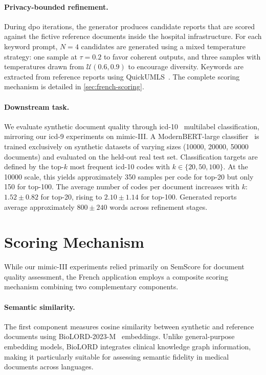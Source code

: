 \paragraph{Privacy-bounded refinement.}
During \gls{dpo} iterations, the generator produces candidate reports that are scored against the fictive reference documents inside the hospital infrastructure.
For each keyword prompt, $N=4$ candidates are generated using a mixed temperature strategy: one sample at $\tau = 0.2$ to favor coherent outputs, and three samples with temperatures drawn from $\mathcal{U}(0.6, 0.9)$ to encourage diversity.
Keywords are extracted from reference reports using QuickUMLS~\citep{soldainiQuickUMLSFastUnsupervised2016}.
The complete scoring mechanism is detailed in \autoref{sec:french-scoring}.

\paragraph{Downstream task.}
We evaluate synthetic document quality through \gls{icd}-10~\citep{who_icd10} multilabel classification, mirroring our \gls{icd}-9 experiments on \gls{mimic}-III.
A ModernBERT-large classifier~\citep{warner2025smarter} is trained exclusively on synthetic datasets of varying sizes (\num{10000}, \num{20000}, \num{50000} documents) and evaluated on the held-out real test set.
Classification targets are defined by the top-$k$ most frequent \gls{icd}-10 codes with $k \in \{20, 50, 100\}$.
At the \num{10000} scale, this yields approximately \num{350} samples per code for top-20 but only \num{150} for top-100.
The average number of codes per document increases with $k$: $1.52 \pm 0.82$ for top-20, rising to $2.10 \pm 1.14$ for top-100.
Generated reports average approximately $800 \pm 240$ words across refinement stages.

\section{Scoring Mechanism}
\label{sec:french-scoring}

While our \gls{mimic}-III experiments relied primarily on SemScore for document quality assessment, the French application employs a composite scoring mechanism combining two complementary components.

\paragraph{Semantic similarity.}
The first component measures cosine similarity between synthetic and reference documents using BioLORD-2023-M~\citep{remy2024biolord} embeddings.
Unlike general-purpose embedding models, BioLORD integrates clinical knowledge graph information, making it particularly suitable for assessing semantic fidelity in medical documents across languages.

